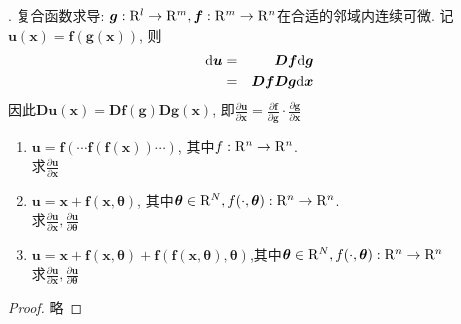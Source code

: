 \documentclass[a4paper,12pt]{article}
\begin{document}
. 复合函数求导: $\bm{g}:\mathrm{R}^l\to\mathrm{R}^m,\bm{f}:\mathrm{R}^m\to\mathrm{R}^n$在合适的邻域内连续可微.
记$\bm{u}(\bm{x})=\bm{f}(\bm{g}(\bm{x}))$, 则
\begin{eqnarray*}
  \mathrm{d}\bm{u}&=&\bm{D}\bm{f}\mathrm{d}\bm{g}\\
    &=& \bm{D}\bm{f}\bm{D}\bm{g}\mathrm{d}\bm{x}
\end{eqnarray*}
因此$\bm{D}\bm{u}(\bm{x})=\bm{D}\bm{f}(\bm{g})\bm{D}\bm{g}(\bm{x})$, 即$\frac{\partial\bm{u}}{\partial\bm{x}}=\frac{\partial\bm{f}}{\partial\bm{g}}\cdot\frac{\partial\bm{g}}{\partial\bm{x}}$
\begin{enumerate}
  \itemsep-0.5em 
  \item $\bm{u}=\bm{f}(\cdots\bm{f}(\bm{f}(\bm{x}))\cdots)$, 其中$f:\mathrm{R}^n\to\mathrm{R}^n$. \\
    求$\frac{\partial\bm{u}}{\partial\bm{x}}$
  \item $\bm{u}=\bm{x}+\bm{f}(\bm{x},\bm{\theta})$, 其中$\bm{\theta}\in\mathrm{R}^N,f(\cdot,\bm{\theta}):\mathrm{R}^n\to\mathrm{R}^n$.\\
    求$\frac{\partial\bm{u}}{\partial\bm{x}},\frac{\partial\bm{u}}{\partial\bm{\theta}}$
  \item $\bm{u}=\bm{x}+\bm{f}(\bm{x},\bm{\theta})+\bm{f}(\bm{f}(\bm{x},\bm{\theta}),\bm{\theta})$,其中$\bm{\theta}\in\mathrm{R}^N,f(\cdot,\bm{\theta}):\mathrm{R}^n\to\mathrm{R}^n$\\
    求$\frac{\partial\bm{u}}{\partial\bm{x}},\frac{\partial\bm{u}}{\partial\bm{\theta}}$
\end{enumerate}
\begin{proof}
  略
\end{proof}


\end{document}
